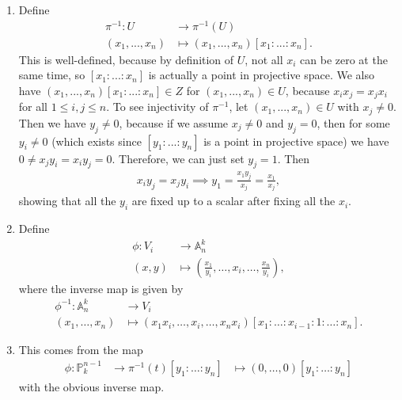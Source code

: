 \newcommand{\sheet}{3}




\maketitle{}

\begin{exercise}{1}
    \begin{enumerate}
        \item Define 
        \begin{align*}
            \pi^{-1}:U &\longrightarrow \pi^{-1}(U) \\
            (x_1,...,x_n)  &\mapsto (x_1,...,x_n)[x_1:...:x_n].
        \end{align*}
        This is well-defined, because by definition of $U$, not all
        $x_i$ can be zero at the same time, so $[x_1:...:x_n]$ is actually a
        point in projective space. We also have 
            $(x_1,...,x_n)[x_1:...:x_n]\in Z$ for $(x_1,...,x_n)\in U$,
            because $x_ix_j=x_jx_i$ for all $1\leq i,j \leq n.$
            To see injectivity of $\pi^{-1}$, let
            $(x_1,...,x_n)\in U$ with $x_j\not = 0$. Then we have $y_j\not = 0$, because
            if we assume $x_j\not =0$ and $y_j=0$, then for some $y_i\not =0$ 
            (which exists since $[y_1:...:y_n]$ is a point in projective space) 
            we have $0\not = x_jy_i= x_iy_j=0.$
            Therefore, we can just set $y_j=1$. Then 
            \begin{align*}
                x_iy_j=x_jy_i \implies y_1=\frac{x_1y_j}{x_j}=\frac{x_1}{x_j},
            \end{align*}
            showing that all the $y_i$ are fixed up to a scalar after fixing all the $x_i$.
        \item    
            Define 
            \begin{align*}
                \phi: V_i &\to \mathbb{A}_n^k\\
                (x,y)&\mapsto (\frac{x_1}{y_i},\dots, x_i,\dots,\frac{x_n}{y_i}),
            \end{align*}
            where the inverse map is given by 
            \begin{align*}
                \phi^{-1}:\mathbb{A}_n^k &\to V_i\\
                (x_1,\dots,x_n)&\mapsto (x_1x_i,\dots,x_i,\dots,x_nx_i)[x_1:\dots:x_{i-1}:1:\dots:x_n].
            \end{align*}
        \item 
            This comes from the map 
            \begin{align}
                \phi:\mathbb{P}_k^{n-1}&\to \pi^{-1}(t)
                [y_1:\dots :y_n]&\mapsto (0,\dots,0)[y_1:\dots:y_n]
            \end{align}
            with the obvious inverse map.
    \end{enumerate}
\end{exercise}

